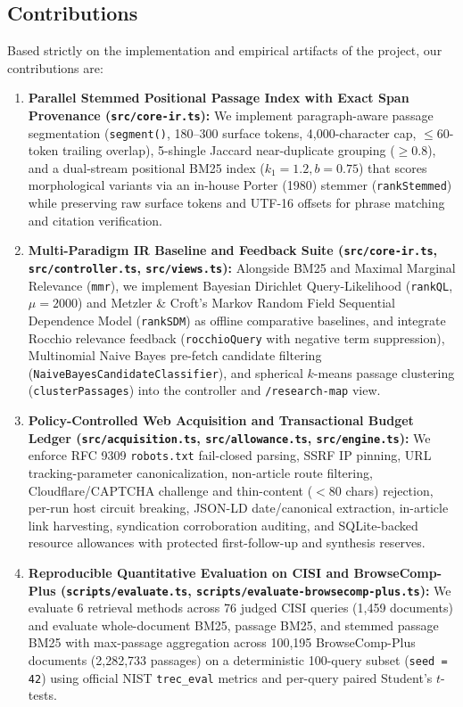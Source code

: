 \documentclass[conference]{IEEEtran}
\begin{document}
\subsection{Contributions}
Based strictly on the implementation and empirical artifacts of the project, our contributions are:
\begin{enumerate}
    \item \textbf{Parallel Stemmed Positional Passage Index with Exact Span Provenance (\texttt{src/core-ir.ts}):} We implement paragraph-aware passage segmentation (\texttt{segment()}, 180--300 surface tokens, 4,000-character cap, $\le 60$-token trailing overlap), 5-shingle Jaccard near-duplicate grouping ($\ge 0.8$), and a dual-stream positional BM25 index ($k_1 = 1.2, b = 0.75$) that scores morphological variants via an in-house Porter (1980) stemmer (\texttt{rankStemmed}) while preserving raw surface tokens and UTF-16 offsets for phrase matching and citation verification.
    \item \textbf{Multi-Paradigm IR Baseline and Feedback Suite (\texttt{src/core-ir.ts}, \texttt{src/controller.ts}, \texttt{src/views.ts}):} Alongside BM25 and Maximal Marginal Relevance (\texttt{mmr}), we implement Bayesian Dirichlet Query-Likelihood (\texttt{rankQL}, $\mu = 2000$) and Metzler \& Croft's Markov Random Field Sequential Dependence Model (\texttt{rankSDM}) as offline comparative baselines, and integrate Rocchio relevance feedback (\texttt{rocchioQuery} with negative term suppression), Multinomial Naive Bayes pre-fetch candidate filtering (\texttt{NaiveBayesCandidateClassifier}), and spherical $k$-means passage clustering (\texttt{clusterPassages}) into the controller and \texttt{/research-map} view.
    \item \textbf{Policy-Controlled Web Acquisition and Transactional Budget Ledger (\texttt{src/acquisition.ts}, \texttt{src/allowance.ts}, \texttt{src/engine.ts}):} We enforce RFC 9309 \texttt{robots.txt} fail-closed parsing, SSRF IP pinning, URL tracking-parameter canonicalization, non-article route filtering, Cloudflare/CAPTCHA challenge and thin-content ($< 80$ chars) rejection, per-run host circuit breaking, JSON-LD date/canonical extraction, in-article link harvesting, syndication corroboration auditing, and SQLite-backed resource allowances with protected first-follow-up and synthesis reserves.
    \item \textbf{Reproducible Quantitative Evaluation on CISI and BrowseComp-Plus (\texttt{scripts/evaluate.ts}, \texttt{scripts/evaluate-browsecomp-plus.ts}):} We evaluate 6 retrieval methods across 76 judged CISI queries (1,459 documents) and evaluate whole-document BM25, passage BM25, and stemmed passage BM25 with max-passage aggregation across 100,195 BrowseComp-Plus documents (2,282,733 passages) on a deterministic 100-query subset (\texttt{seed = 42}) using official NIST \texttt{trec\_eval} metrics and per-query paired Student's $t$-tests.
\end{enumerate}
\end{document}
